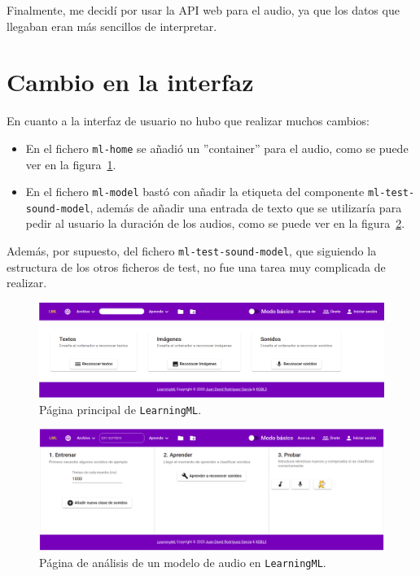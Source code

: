 \documentclass[a4paper, 12pt]{book}
\begin{document}
Finalmente, me decidí por usar la API web para el audio, ya que los datos que llegaban eran más sencillos de interpretar.

\section{Cambio en la interfaz}
\label{sec:cambio-interfaz}

En cuanto a la interfaz de usuario no hubo que realizar muchos cambios:
\begin{itemize}
	\item En el fichero \texttt{ml-home} se añadió un ''container'' para el audio, como se puede ver en la figura~\ref{fig:main-page}.
	\item En el fichero \texttt{ml-model} bastó con añadir la etiqueta del componente \texttt{ml-test-sound-model}, además de añadir una entrada de texto que se utilizaría para pedir al usuario la duración de los audios, como se puede ver en la figura~\ref{fig:audio-page}.
\end{itemize}

Además, por supuesto, del fichero \texttt{ml-test-sound-model}, que siguiendo la estructura de los otros ficheros de test, no fue una tarea muy complicada de realizar.

\begin{figure}
	\centering
	\includegraphics[width=12cm, keepaspectratio]{img/pagina-principal.png}
	\caption{Página principal de \texttt{LearningML}.}\label{fig:main-page}
\end{figure}

\begin{figure}
	\centering
	\includegraphics[width=12cm, keepaspectratio]{img/audio-model.png}
	\caption{Página de análisis de un modelo de audio en \texttt{LearningML}.}\label{fig:audio-page}
\end{figure}
\end{document}
